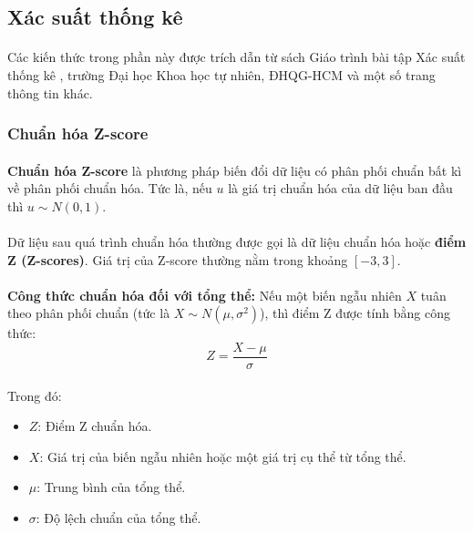 \subsection{Xác suất thống kê} 
\paragraph{}{Các kiến thức trong phần này được trích dẫn từ sách Giáo trình bài tập Xác suất thống kê \cite{xstk}, trường Đại học Khoa học tự nhiên, ĐHQG-HCM và một số trang thông tin khác.}

\subsubsection{Chuẩn hóa Z-score}
\label{label:standart scaler}

\paragraph{}{\textbf{Chuẩn hóa Z-score} là phương pháp biến đổi dữ liệu có phân phối chuẩn bất kì về phân phối chuẩn hóa.} Tức là, nếu \(u\) là giá trị chuẩn hóa của dữ liệu ban đầu thì \textbf{\(u \sim N(0,1)\)}.

\paragraph{}{Dữ liệu sau quá trình chuẩn hóa thường được gọi là dữ liệu chuẩn hóa hoặc \textbf{điểm Z (Z-scores)}. Giá trị của Z-score thường nằm trong khoảng \([-3, 3]\).}

\paragraph{}{\textbf{Công thức chuẩn hóa đối với tổng thể:} Nếu một biến ngẫu nhiên $X$ tuân theo phân phối chuẩn (tức là $X \sim N(\mu, \sigma^2)$), thì điểm Z được tính bằng công thức:}
\[
Z = \frac{X - \mu}{\sigma}
\]
\paragraph{}{Trong đó:}
\begin{itemize}
    \item $Z$: Điểm Z chuẩn hóa.
    \item $X$: Giá trị của biến ngẫu nhiên hoặc một giá trị cụ thể từ tổng thể.
    \item $\mu$: Trung bình của tổng thể.
    \item $\sigma$: Độ lệch chuẩn của tổng thể.
\end{itemize}

